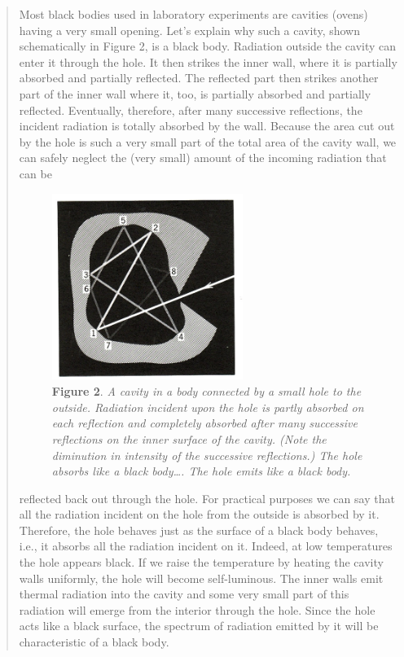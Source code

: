 \begin{quotation}
Most black bodies used in laboratory experiments are cavities (ovens)
having a very small opening. Let's explain why such a cavity, shown
schematically in Figure 2, is a black body. Radiation outside the cavity
can enter it through the hole. It then strikes the inner wall, where it
is partially absorbed and partially reflected. The reflected part then
strikes another part of the inner wall where it, too, is partially
absorbed and partially reflected. Eventually, therefore, after many
successive reflections, the incident radiation is totally absorbed by
the wall. Because the area cut out by the hole is such a very small part
of the total area of the cavity wall, we can safely neglect the (very
small) amount of the incoming radiation that can be
%
\begin{figure}[h]
  \begin{center}
  \captionsetup{width=.75\textwidth}
  \includegraphics[width=2.4375in,height=2.38542in]{images/05_planck/image007.jpg}
  \caption*{\textbf{Figure 2}. \emph{A cavity in a body connected by a small hole to the
    outside. Radiation incident upon the hole is partly absorbed on each
    reflection and completely absorbed after many successive reflections on
    the inner surface of the cavity. (Note the diminution in intensity of
    the successive reflections.) The hole absorbs like a black body\ldots.
    The hole emits like a black body.}}
  \end{center}
\end{figure}
%
reflected back out through the hole. For practical purposes we can say
that all the radiation incident on the hole from the outside is absorbed
by it. Therefore, the hole behaves just as the surface of a black body
behaves, i.e., it absorbs all the radiation incident on it. Indeed, at
low temperatures the hole appears black. If we raise the temperature by
heating the cavity walls uniformly, the hole will become self-luminous.
The inner walls emit thermal radiation into the cavity and some very
small part of this radiation will emerge from the interior through the
hole. Since the hole acts like a black surface, the spectrum of
radiation emitted by it will be characteristic of a black body.


\end{quotation}
